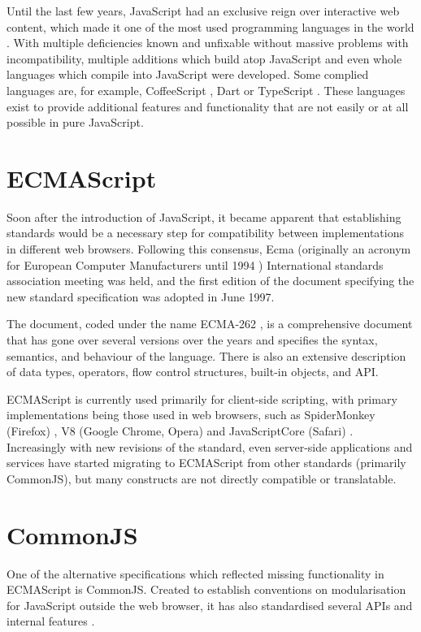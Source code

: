 Until the last few years, JavaScript had an exclusive reign over interactive web
content, which made it one of the most used programming languages in the world
\cite{stack-overflow-survey}. With multiple deficiencies known and unfixable
without massive problems with incompatibility, multiple additions which build
atop JavaScript and even whole languages which compile into JavaScript were
developed. Some complied languages are, for example, CoffeeScript
\cite{coffeescript-homepage}, Dart \cite{dart-homepage} or TypeScript
\cite{typescript-homepage}. These languages exist to provide additional features
and functionality that are not easily or at all possible in pure JavaScript.


\section*{ECMAScript}
Soon after the introduction of JavaScript, it became apparent that establishing
standards would be a necessary step for compatibility between implementations in
different web browsers. Following this consensus, Ecma (originally an acronym
for European Computer Manufacturers until 1994 \cite{ecma-mission})
International standards association meeting was held, and the first edition of
the document specifying the new standard specification was adopted in June 1997.

The document, coded under the name ECMA-262 \cite{ecma-262}, is a comprehensive
document that has gone over several versions over the years and specifies the
syntax, semantics, and behaviour of the language. There is also an extensive
description of data types, operators, flow control structures, built-in objects,
and API.

ECMAScript is currently used primarily for client-side scripting, with primary
implementations being those used in web browsers, such as SpiderMonkey (Firefox)
\cite{spidermonkey-documentation}, V8 (Google Chrome, Opera) \cite{v8-homepage}
and JavaScriptCore (Safari) \cite{javascript-core}. Increasingly with new
revisions of the standard, even server-side applications and services have
started migrating to ECMAScript from other standards (primarily CommonJS), but
many constructs are not directly compatible or translatable.


\section*{CommonJS}
One of the alternative specifications which reflected missing functionality in
ECMAScript is CommonJS. Created to establish conventions on modularisation for
JavaScript outside the web browser, it has also standardised several APIs and
internal features \cite{commonjs-spec}. 

